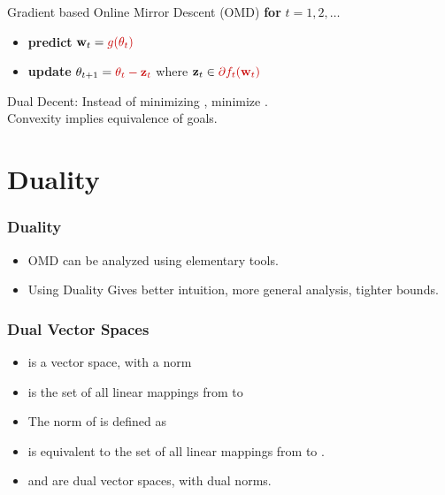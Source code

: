 \documentclass{beamer}
\begin{document}
\begin{small}
\begin{frame}{Gradient based Online Mirror Descent (OMD)}
\textbf{for} \( t = 1,2,\dots \)
\begin{itemize}
    \item \textbf{predict} \( \mathbf{w}_t = \textcolor{mathcolor}{ g(\theta_t) } \)
    \item \textbf{update} \( \theta_{t+1} = \textcolor{mathcolor}{ \theta_t - \mathbf{z}_t } \) where \( \mathbf{z}_t \in \textcolor{mathcolor}{ \partial f_t(\mathbf{w}_t) } \)
    \end{itemize}
    Dual Decent: Instead of minimizing , minimize . \\
    Convexity implies equivalence of goals.
\end{frame}

\section{Duality}

\begin{frame}
  \frametitle{Duality}
  \begin{itemize}
  \item OMD can be analyzed using elementary tools.
    \item Using Duality Gives better intuition, more general analysis, tighter bounds.
  \end{itemize}
\end{frame}

\begin{frame}
\frametitle{Dual Vector Spaces}

\begin{itemize}
\item {} is a vector space, with a norm 
\item {} is the set of all linear mappings from  to
  \item
  The norm of  is defined as
\item {} is equivalent to the set of all linear mappings from  to
  .
\item {} and  are dual vector spaces, with dual norms. 
\end{itemize}
\end{frame}


\end{small}
\end{document}
